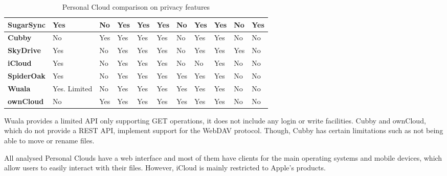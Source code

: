 {\begin{table}
\begin{center}
\begin{tabular}{ | p{3.0cm} | p{0.9cm} | p{0.9cm} | p{0.9cm} | p{0.9cm} | p{0.9cm} | p{0.9cm} | p{0.9cm} | p{0.9cm} | p{0.9cm} | p{0.9cm} | }
	\textbf{SugarSync} & 
	Yes &
	No &
	Yes &
	Yes &
	Yes &
	No &
	Yes &
	Yes &
	No &
	Yes \\ \hline
	
	\textbf{Cubby} &
	No &
	Yes &
	Yes &
	Yes &
	Yes &
	No &
	Yes &
	Yes &
	No &
	No \\ \hline
	
	\textbf{SkyDrive} & 
	Yes &
	No &
	Yes &
	Yes &
	Yes &
	No &
	Yes &
	Yes &
	Yes &
	No \\ \hline

	\textbf{iCloud} &
	Yes &
	No &
	Yes &
	Yes &
	Yes &
	No &
	No &
	Yes &
	No &
	No \\ \hline
	
	\textbf{SpiderOak} & 
	Yes &
	No &
	Yes &
	Yes &
	Yes &
	Yes &
	Yes &
	Yes &
	No &
	No \\ \hline

	\textbf{Wuala} &
	Yes. Limited &
	No &
	Yes &
	Yes &
	Yes &
	Yes &
	Yes &
	Yes &
	No &
	No \\ \hline
	
	\textbf{ownCloud} &
	No &
	Yes &
	Yes &
	Yes &
	Yes &
	Yes &
	Yes &
	Yes &
	No &
	No \\ \hline
    \end{tabular}
    \caption{Personal Cloud comparison on privacy features}
    \label{tab:pc_platform}
\end{center}
\end{table}
}

Wuala provides a limited API only supporting GET operations, it does not include any login or write facilities. Cubby and ownCloud, which do not provide a REST API, implement support for the WebDAV protocol. Though, Cubby has certain limitations such as not being able to move or rename files.

All analysed Personal Clouds have a web interface and most of them have clients for the main operating systems and mobile devices, which allow users to easily interact with their files. However, iCloud is mainly restricted to Apple's products.